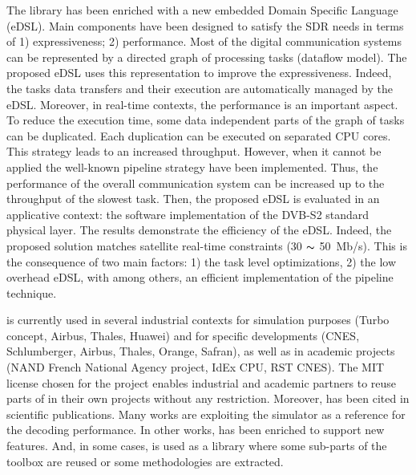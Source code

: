 The \AFFECT library has been enriched with a new embedded Domain Specific
Language (eDSL). Main components have been designed to satisfy the SDR needs in
terms of 1) expressiveness; 2) performance. Most of the digital communication
systems can be represented by a directed graph of processing tasks (dataflow
model). The proposed eDSL uses this representation to improve the
expressiveness. Indeed, the tasks data transfers and their execution are
automatically managed by the eDSL. Moreover, in real-time contexts, the
performance is an important aspect. To reduce the execution time, some data
independent parts of the graph of tasks can be duplicated. Each duplication can
be executed on separated CPU cores. This strategy leads to an increased
throughput. However, when it cannot be applied the well-known pipeline strategy
have been implemented. Thus, the performance of the overall communication system
can be increased up to the throughput of the slowest task. Then, the proposed
eDSL is evaluated in an applicative context: the software implementation of the
DVB-S2 standard physical layer. The results demonstrate the efficiency of the
\AFFECT eDSL. Indeed, the proposed solution matches satellite real-time
constraints (30 $\thicksim$ 50~Mb/s). This is the consequence of two main
factors: 1) the task level optimizations, 2) the low overhead eDSL, with among
others, an efficient implementation of the pipeline technique.

\AFFECT is currently used in several industrial contexts for simulation purposes
(Turbo concept, Airbus, Thales, Huawei) and for specific developments (CNES,
Schlumberger, Airbus, Thales, Orange, Safran), as well as in academic projects
(NAND French National Agency project, IdEx CPU, RST CNES). The MIT license
chosen for the project enables industrial and academic partners to reuse parts
of \AFFECT in their own projects without any restriction. Moreover, \AFFECT has
been cited in scientific publications. Many works are exploiting the \AFFECT
simulator as a reference for the decoding performance. In other works, \AFFECT
has been enriched to support new features. And, in some cases, \AFFECT is used
as a library where some sub-parts of the toolbox are reused or some
methodologies are extracted.

